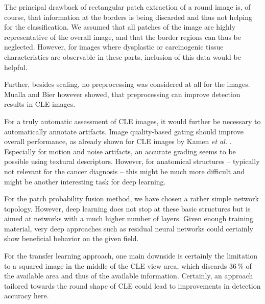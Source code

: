 \documentclass[fleqn,10pt]{wlscirep}
\begin{document}

The principal drawback of rectangular patch extraction of a round
image is, of course, that information at the borders is being
discarded and thus not helping for the classification. We assumed
that all patches of the image are highly representative of the overall
image, and that the border regions can thus be neglected. However, for
images where dysplastic or carcinogenic tissue characteristics are
observable in these parts, inclusion of this data would be helpful.  

Further, besides scaling, no preprocessing was considered at all for the images. Mualla\cite{Mualla:2014ko} and Bier\cite{Bier:2015ju} however showed, that preprocessing can improve detection results in CLE images. 

For a truly automatic assessment of CLE images, it would further be necessary to automatically annotate artifacts. Image quality-based gating should improve overall performance, as already shown for CLE images by Kamen \textit{et al.} \cite{Kamen:2016jw}. Especially for motion and noise artifacts, an accurate grading seems to be possible using textural descriptors. However, for anatomical structures -- typically not relevant for the cancer diagnosis -- this might be much more difficult and might be another interesting task for deep learning.


For the patch probability fusion method, we have chosen a rather simple network topology. However, deep learning does not stop at these basic structures but is aimed at networks with a much higher number of layers. Given enough training material, very deep approaches such as residual neural networks \cite{He:2016ib} could certainly show beneficial behavior on the given field. 

For the transfer learning approach, one main downside is certainly the limitation to a squared image in the middle of the CLE view area, which discards 36\,\% of the available area and thus of the available information. Certainly, an approach tailored towards the round shape of CLE could lead to improvements in detection accuracy here.
\end{document}
